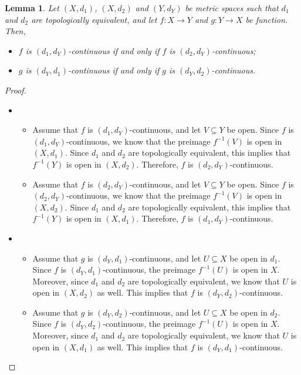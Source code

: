 \documentclass[a4paper, openany]{memoir}
\theoremstyle{definition}
\theoremstyle{plain}
\newtheorem{lemma}[definition]{Lemma}
\begin{document}
\begin{lemma}
Let $(X, d_1)$, $(X, d_2)$ and $(Y, d_Y)$ be metric spaces such that $d_1$ and $d_2$ are topologically equivalent, and let $f: X \to Y$ and $g: Y \to X$ be function. Then, 
\begin{itemize}
    \item $f$ is $(d_1, d_Y)$-continuous if and only if $f$ is $(d_2, d_Y)$-continuous;
    \item $g$ is $(d_Y, d_1)$-continuous if and only if $g$ is $(d_Y, d_2)$-continuous.
\end{itemize}
\end{lemma}
\begin{proof}
\hspace*{0pt}
\begin{itemize}
    \item \begin{itemize}
        \item Assume that $f$ is $(d_1, d_Y)$-continuous, and let $V \subseteq Y$ be open. Since $f$ is $(d_1, d_Y)$-continuous, we know that the preimage $f^{-1}(V)$ is open in $(X, d_1)$. Since $d_1$ and $d_2$ are topologically equivalent, this implies that $f^{-1}(Y)$ is open in $(X, d_2)$. Therefore, $f$ is $(d_2, d_Y)$-continuous.
        
        \item Assume that $f$ is $(d_2, d_Y)$-continuous, and let $V \subseteq Y$ be open. Since $f$ is $(d_2, d_Y)$-continuous, we know that the preimage $f^{-1}(V)$ is open in $(X, d_2)$. Since $d_1$ and $d_2$ are topologically equivalent, this implies that $f^{-1}(Y)$ is open in $(X, d_1)$. Therefore, $f$ is $(d_1, d_Y)$-continuous.
    \end{itemize}
    
    \item \begin{itemize}
        \item Assume that $g$ is $(d_Y, d_1)$-continuous, and let $U \subseteq X$ be open in $d_1$. Since $f$ is $(d_Y, d_1)$-continuous, the preimage $f^{-1}(U)$ is open in $X$. Moreover, since $d_1$ and $d_2$ are topologically equivalent, we know that $U$ is open in $(X, d_2)$ as well. This implies that $f$ is $(d_Y, d_2)$-continuous.
        
        \item Assume that $g$ is $(d_Y, d_2)$-continuous, and let $U \subseteq X$ be open in $d_2$. Since $f$ is $(d_Y, d_2)$-continuous, the preimage $f^{-1}(U)$ is open in $X$. Moreover, since $d_1$ and $d_2$ are topologically equivalent, we know that $U$ is open in $(X, d_1)$ as well. This implies that $f$ is $(d_Y, d_1)$-continuous.
    \end{itemize}
\end{itemize}
\end{proof}
\end{document}
